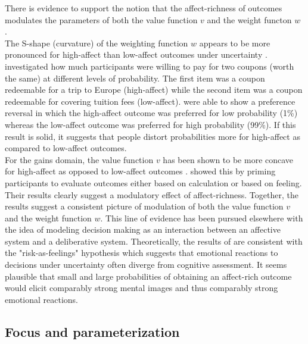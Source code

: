 \documentclass[12pt]{article}
\begin{document}
There is evidence to support
the notion that the affect-richness of outcomes modulates
the parameters of both the value function $v$
\autocite{hsee2004music} and the weight functon $w$
\autocite{
rottenstreich2001money}. \\

The S-shape (curvature) of the weighting function
$w$ appears to be more pronounced
for high-affect than low-affect outcomes under
uncertainty \autocite{rottenstreich2001money}.
\textcite{rottenstreich2001money}
investigated how much participants were
willing to pay for two coupons
(worth the same) at different
levels of probability. The first item was
a coupon redeemable for a trip to
Europe (high-affect) while the second
item was a coupon redeemable for
covering tuition fees (low-affect).
\textcite{rottenstreich2001money}
were able to show a preference reversal in
which the high-affect outcome was preferred for
low probability (1\%) whereas the low-affect
outcome was preferred for high probability (99\%).
If this result is solid, it suggests
that people distort probabilities
more for high-affect as compared to low-affect
outcomes. \\

For the gains domain, the value function $v$
has been shown to be more
concave for high-affect as opposed to low-affect
outcomes \autocite{hsee2004music}.
\textcite{hsee2004music} showed this by
priming participants to
evaluate outcomes either based on calculation or
based on feeling. Their results clearly suggest
a modulatory effect of affect-richness.
Together, the results suggest a consistent picture
of modulation of both the value function $v$ and
the weight function  $w$. This line of evidence
has been pursued elsewhere \autocite{
	mukherjee2010dual,
mukherjee2011thinking} with the idea of modeling
decision making as an interaction between an
affective system and a deliberative system.
Theoretically, the results of
\textcite{rottenstreich2001money,
hsee2004music} are consistent with the
"risk-as-feelings" hypothesis \autocite{loewenstein2001risk}
which suggests that emotional reactions
to decisions under uncertainty often diverge
from cognitive assessment. It seems plausible
that small and large probabilities of obtaining an
affect-rich outcome would elicit
comparably strong mental images and thus
comparably strong emotional reactions.

\subsection{Focus and parameterization}
\end{document}
